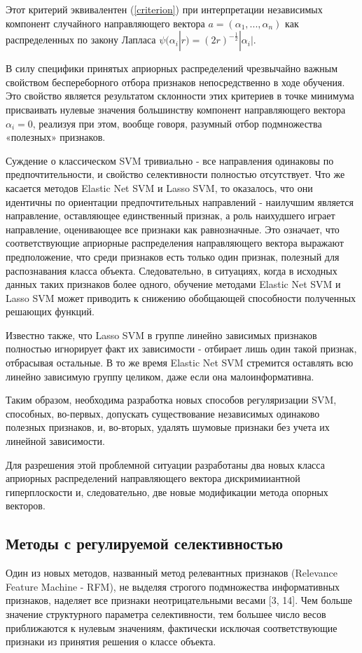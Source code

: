 \documentclass[../body.tex]{subfiles}
\begin{document}
Этот критерий эквивалентен (\ref{criterion}) при интерпретации независимых компонент случайного направляющего вектора $a=(\alpha_1, ..., \alpha_n)$ как распределенных по закону Лапласа $\psi(\alpha_i|r) = (2r)^{-\frac{1}{2}}|\alpha_i|$.

В силу специфики принятых априорных распределений чрезвычайно важным свойством беспереборного отбора признаков непосредственно в ходе обучения. Это свойство является результатом склонности этих критериев в точке минимума присваивать нулевые значения большинству компонент направляющего вектора $\alpha_i = 0$, реализуя при этом, вообще говоря, разумный отбор подмножества «полезных» признаков. 

Суждение о классическом SVM тривиально - все направления одинаковы по предпочтительности, и свойство селективности полностью отсутствует. Что же касается методов Elastic Net SVM и Lasso SVM, то оказалось, что они идентичны по ориентации предпочтительных направлений - наилучшим является направление, оставляющее единственный признак, а роль наихудшего играет направление, оценивающее все признаки как равнозначные. Это означает, что соответствующие априорные распределения направляющего вектора выражают предположение, что среди признаков есть только один признак, полезный для распознавания класса объекта. Следовательно, в ситуациях, когда в исходных данных таких признаков более одного, обучение методами Elastic Net SVM и Lasso SVM
может приводить к снижению обобщающей способности полученных решающих функций.

Известно также, что Lasso SVM в группе линейно зависимых признаков полностью игнорирует факт их зависимости - отбирает лишь один такой признак, отбрасывая остальные. В то же время Elastic Net SVM стремится оставлять всю линейно зависимую группу целиком, даже если она малоинформативна.

Таким образом, необходима разработка новых способов регуляризации SVM, способных, во-первых, допускать существование независимых одинаково полезных признаков, и, во-вторых, удалять шумовые признаки без учета их линейной зависимости. 

Для разрешения этой проблемной ситуации разработаны два новых
класса априорных распределений направляющего вектора дискримииантной гиперплоскости и, следовательно, две новые модификации метода опорных векторов.

\subsection{Методы с регулируемой селективностью }
Один из новых методов, названный метод релевантных признаков (Relevance Feature Machine - RFM), не выделяя строгого подмножества информативных признаков, наделяет все признаки неотрицательными весами [3, 14]. Чем больше значение структурного параметра селективности, тем большее число весов приближаются к нулевым значениям, фактически исключая соответствующие признаки из принятия решения о классе объекта.
\end{document}
